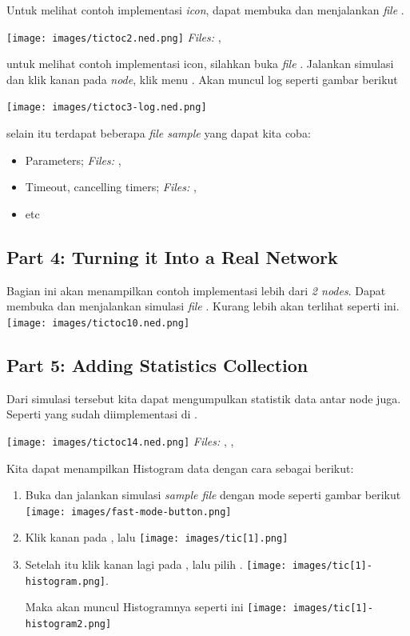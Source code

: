 \documentclass[conference]{IEEEtran}
\begin{document}
Untuk melihat contoh implementasi \textit{icon}, dapat membuka  dan menjalankan \textit{file} .\break

\texttt{[image: images/tictoc2.ned.png]}
\textit{Files:} , 


untuk melihat contoh implementasi icon, silahkan buka \textit{file} . Jalankan simulasi dan klik kanan pada \textit{node}, klik menu . Akan muncul log seperti gambar berikut

\texttt{[image: images/tictoc3-log.ned.png]}


selain itu terdapat beberapa \textit{file sample} yang dapat kita coba:
\begin{itemize}
	\item Parameters; \textit{Files: }, 
	\item Timeout, cancelling timers; \textit{Files: }, 
	\item etc
\end{itemize}

\subsection{Part 4: Turning it Into a Real Network}
Bagian ini akan menampilkan contoh implementasi lebih dari \textit{2 nodes}. Dapat membuka dan menjalankan simulasi \textit{file}  . Kurang lebih akan terlihat seperti ini.
\texttt{[image: images/tictoc10.ned.png]}

\subsection{Part 5: Adding Statistics Collection}
Dari simulasi tersebut kita dapat mengumpulkan statistik data antar node juga. Seperti yang sudah diimplementasi di .

\texttt{[image: images/tictoc14.ned.png]}\break
\textit{Files:} , , 

Kita dapat menampilkan Histogram data dengan cara sebagai berikut:
\begin{enumerate}
	\item Buka dan jalankan simulasi \textit{sample file}  dengan mode  seperti gambar berikut\break
	      \texttt{[image: images/fast-mode-button.png]}

	\item Klik kanan pada , lalu \break
	      \texttt{[image: images/tic[1].png]}

	\item Setelah itu klik kanan lagi pada , lalu pilih .\break
	      \texttt{[image: images/tic[1]-histogram.png]}. \break

	      Maka akan muncul Histogramnya seperti ini\break
	      \texttt{[image: images/tic[1]-histogram2.png]}
\end{enumerate}
\end{document}

